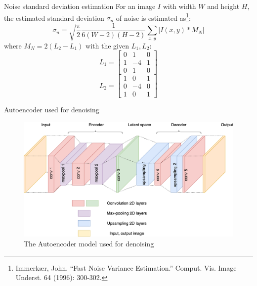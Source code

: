\documentclass{libs/ufc_format}
\begin{document}

\begin{frame}{\small Noise standard deviation estimation}
    For an image $I$ with width $W$ and height $H$, the estimated standard deviation $\sigma_n$ of noise is estimated as\footnote[frame]{\tiny Immerkær, John. “Fast Noise Variance Estimation.” Comput. Vis. Image Underst. 64 (1996): 300-302.}:
    \begin{equation}
        \sigma_n = \sqrt{\frac{\pi}{2}}\frac{1}{6(W-2)(H-2)}\sum_{x,y}|{I(x,y)*M_N}|
    \end{equation}
    where $M_N = 2(L_2-L_1)$ with the given $L_1, L_2$:
    \begin{equation}
        L_1 = \begin{bmatrix}
            0 & 1  & 0 \\
            1 & -4 & 1 \\
            0 & 1  & 0
        \end{bmatrix}
    \end{equation}
    \begin{equation}
        L_2 = \begin{bmatrix}
            1 & 0  & 1 \\
            0 & -4 & 0 \\
            1 & 0  & 1
        \end{bmatrix}
    \end{equation}

\end{frame}


\begin{frame}{\small Autoencoder used for denoising}
    \begin{figure}
        \centering
        \includegraphics[width=1\textwidth]{libs/aebuilt.drawio.png}
        \caption{The Autoencoder model used for denoising}
    \end{figure}

\end{frame}
\end{document}
